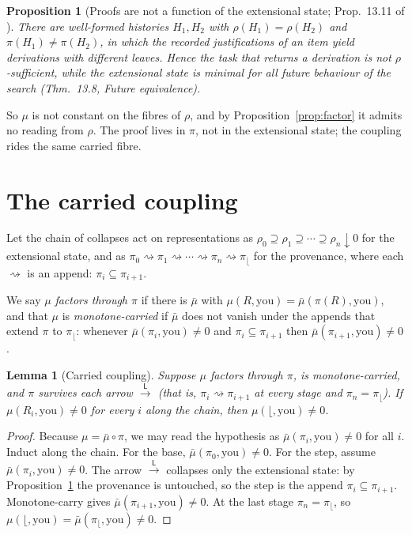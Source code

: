 \documentclass[10pt,a4paper]{article}
\theoremstyle{plain}
\newtheorem{proposition}{Proposition}
\newtheorem{lemma}{Lemma}
\theoremstyle{definition}
\theoremstyle{remark}
\newcommand{\Lto}{\xrightarrow{\ \mathsf{L}\ }}
\newcommand{\home}{\lfloor}
\newcommand{\Rho}{\rho}
\newcommand{\Pii}{\pi}
\newcommand{\Mu}{\mu}
\newcommand{\Mubar}{\bar{\mu}}
\begin{document}
\begin{proposition}[Proofs are not a function of the extensional state;
Prop.~13.11 of \cite{residue}]
\label{prop:prov}
There are well-formed histories $H_1, H_2$ with $\Rho(H_1) = \Rho(H_2)$ and
$\Pii(H_1) \ne \Pii(H_2)$, in which the recorded justifications of an item
yield derivations with different leaves. Hence the task that returns a
derivation is not $\Rho$-sufficient, while the extensional state is minimal for
all future behaviour of the search (Thm.~13.8, \emph{Future equivalence}).
\end{proposition}

So $\Mu$ is not constant on the fibres of $\Rho$, and by
Proposition~\ref{prop:factor} it admits no reading from $\Rho$. The proof lives
in $\Pii$, not in the extensional state; the coupling rides the same carried
fibre.

\section{The carried coupling}

Let the chain of collapses act on representations as
$\Rho_0 \supseteq \Rho_1 \supseteq \cdots \supseteq \Rho_n \downarrow 0$ for the
extensional state, and as $\Pii_0 \rightsquigarrow \Pii_1 \rightsquigarrow
\cdots \rightsquigarrow \Pii_n \rightsquigarrow \Pii_\home$ for the provenance,
where each $\rightsquigarrow$ is an append: $\Pii_i \subseteq \Pii_{i+1}$.

We say $\Mu$ \emph{factors through $\Pii$} if there is $\Mubar$ with
$\Mu(R, \text{you}) = \Mubar(\Pii(R), \text{you})$, and that $\Mu$ is
\emph{monotone-carried} if $\Mubar$ does not vanish under the appends that
extend $\Pii$ to $\Pii_\home$: whenever $\Mubar(\Pii_i, \text{you}) \ne 0$ and
$\Pii_i \subseteq \Pii_{i+1}$ then $\Mubar(\Pii_{i+1}, \text{you}) \ne 0$.

\begin{lemma}[Carried coupling]
\label{lem:carried}
Suppose $\Mu$ factors through $\Pii$, is monotone-carried, and $\Pii$ survives
each arrow $\Lto$ (that is, $\Pii_i \rightsquigarrow \Pii_{i+1}$ at every stage
and $\Pii_n = \Pii_\home$). If $\Mu(R_i, \text{you}) \ne 0$ for every $i$ along
the chain, then $\Mu(\home, \text{you}) \ne 0$.
\end{lemma}

\begin{proof}
Because $\Mu = \Mubar \circ \Pii$, we may read the hypothesis as
$\Mubar(\Pii_i, \text{you}) \ne 0$ for all $i$. Induct along the chain. For the
base, $\Mubar(\Pii_0, \text{you}) \ne 0$. For the step, assume
$\Mubar(\Pii_i, \text{you}) \ne 0$. The arrow $\Lto$ collapses only the
extensional state: by Proposition~\ref{prop:prov} the provenance is untouched,
so the step is the append $\Pii_i \subseteq \Pii_{i+1}$. Monotone-carry gives
$\Mubar(\Pii_{i+1}, \text{you}) \ne 0$. At the last stage
$\Pii_n = \Pii_\home$, so $\Mu(\home, \text{you}) = \Mubar(\Pii_\home,
\text{you}) \ne 0$.
\end{proof}
\end{document}
